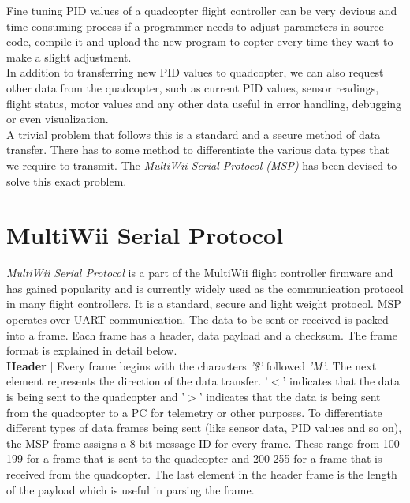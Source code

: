 \documentclass[a4paper,12pt,oneside]{book}
\begin{document}
Fine tuning PID values of a quadcopter flight controller can be very devious and time consuming process if a programmer needs to adjust parameters in source code, compile it and upload the new program to copter every time they want to make a slight adjustment.\\ 

In addition to transferring new PID values to quadcopter, we can also request other data from the quadcopter, such as current PID values, sensor readings, flight status, motor values and any other data useful in error handling, debugging or even visualization.\\

A trivial problem that follows this is a standard and a secure method of data transfer. There has to some method to differentiate the various data types that we require to transmit. The \textit{MultiWii Serial Protocol (MSP)} has been devised to solve this exact problem.\\

\clearpage

\section{MultiWii Serial Protocol}
\textit{MultiWii Serial Protocol} is a part of the MultiWii flight controller firmware and has gained popularity and is currently widely used as the communication protocol in many flight controllers. It is a standard, secure and light weight protocol. MSP operates over UART communication. The data to be sent or received is packed into a frame. Each frame has a header, data payload and a checksum. The frame format is explained in detail below.\\

\textbf{Header} | Every frame begins with the characters \textit{'\$'} followed \textit{'M'}. The next element represents the direction of the data transfer. '$<$' indicates that the data is being sent to the quadcopter and '$>$' indicates that the data is being sent from the quadcopter to a PC for telemetry or other purposes. To differentiate different types of data frames being sent (like sensor data, PID values and so on), the MSP frame assigns a 8-bit message ID for every frame. These range from 100-199 for a frame that is sent to the quadcopter and 200-255 for a frame that is received from the quadcopter. The last element in the header frame is the length of the payload which is useful in parsing the frame.\\
\end{document}
